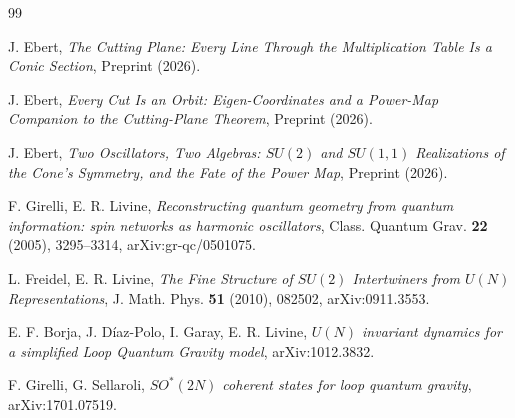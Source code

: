 \documentclass[11pt]{amsart}
\theoremstyle{remark}
\begin{document}
\begin{thebibliography}{99}

 J. Ebert, \emph{The Cutting Plane: Every Line Through the Multiplication Table Is a Conic Section}, Preprint (2026).

 J. Ebert, \emph{Every Cut Is an Orbit: Eigen-Coordinates and a Power-Map Companion to the Cutting-Plane Theorem}, Preprint (2026).

 J. Ebert, \emph{Two Oscillators, Two Algebras: $SU(2)$ and $SU(1,1)$ Realizations of the Cone's Symmetry, and the Fate of the Power Map}, Preprint (2026).

 F. Girelli, E. R. Livine, \emph{Reconstructing quantum geometry from quantum information: spin networks as harmonic oscillators}, Class. Quantum Grav. \textbf{22} (2005), 3295--3314, arXiv:gr-qc/0501075.

 L. Freidel, E. R. Livine, \emph{The Fine Structure of $SU(2)$ Intertwiners from $U(N)$ Representations}, J. Math. Phys. \textbf{51} (2010), 082502, arXiv:0911.3553.

 E. F. Borja, J. D\'iaz-Polo, I. Garay, E. R. Livine, \emph{$U(N)$ invariant dynamics for a simplified Loop Quantum Gravity model}, arXiv:1012.3832.

 F. Girelli, G. Sellaroli, \emph{$SO^*(2N)$ coherent states for loop quantum gravity}, arXiv:1701.07519.

\end{thebibliography}
\end{document}

